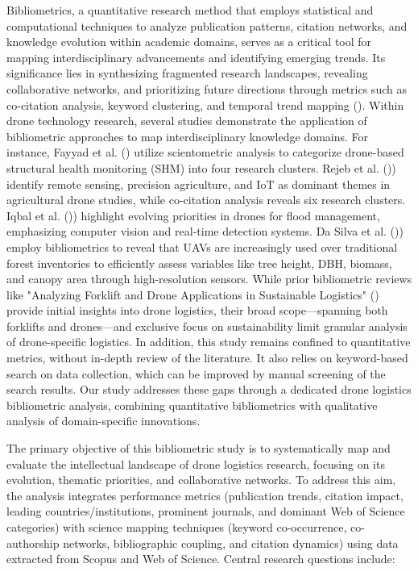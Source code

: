 \documentclass{article}
\begin{document}
Bibliometrics, a quantitative research method that employs statistical and computational techniques to analyze publication patterns, citation networks, and knowledge evolution within academic domains, serves as a critical tool for mapping interdisciplinary advancements and identifying emerging trends. Its significance lies in synthesizing fragmented research landscapes, revealing collaborative networks, and prioritizing future directions through metrics such as co-citation analysis, keyword clustering, and temporal trend mapping (\cite{WOS:000958189000001}). Within drone technology research, several studies demonstrate the application of bibliometric approaches to map interdisciplinary knowledge domains. For instance, Fayyad et al. (\cite{WOS:001229751500001}) utilize scientometric analysis to categorize drone-based structural health monitoring (SHM) into four research clusters.  Rejeb et al. (\cite{WOS:000830895100002})) identify remote sensing, precision agriculture, and IoT as dominant themes in agricultural drone studies, while co-citation analysis reveals six research clusters. Iqbal et al.  (\cite{WOS:000914960100001})) highlight evolving priorities in drones for flood management, emphasizing computer vision and real-time detection systems.  Da Silva et al.  (\cite{WOS:001366904300001})) employ bibliometrics to reveal that UAVs are increasingly used over traditional forest inventories to efficiently assess variables like tree height, DBH, biomass, and canopy area through high-resolution sensors. While prior bibliometric reviews like "Analyzing Forklift and Drone Applications in Sustainable Logistics" (\cite{WOS:001329532200078}) provide initial insights into drone logistics, their broad scope—spanning both forklifts and drones—and exclusive focus on sustainability limit granular analysis of drone-specific logistics. In addition, this study remains confined to quantitative metrics, without in-depth review of the literature. It also relies on keyword-based search on data collection, which can be improved by manual screening of the search results. Our study addresses these gaps through a dedicated drone logistics bibliometric analysis, combining quantitative bibliometrics with qualitative analysis of domain-specific innovations. 

The primary objective of this bibliometric study is to systematically map and evaluate the intellectual landscape of drone logistics research, focusing on its evolution, thematic priorities, and collaborative networks. To address this aim, the analysis integrates performance metrics (publication trends, citation impact, leading countries/institutions, prominent journals, and dominant Web of Science categories) with science mapping techniques (keyword co-occurrence, co-authorship networks, bibliographic coupling, and citation dynamics) using data extracted from Scopus and Web of Science. Central research questions include: 
\end{document}
